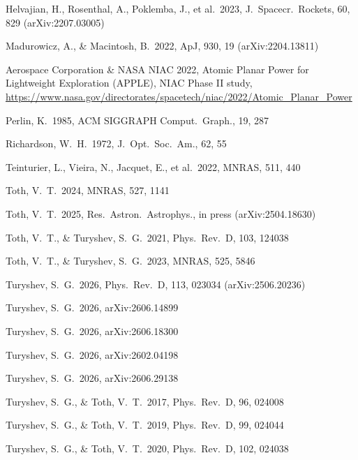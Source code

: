﻿\documentclass[twocolumn,10pt]{article}
\begin{document}
\begin{thebibliography}{}
Helvajian, H., Rosenthal, A., Poklemba, J., et al.\ 2023, J.\ Spacecr.\
Rockets, 60, 829 (arXiv:2207.03005)

Madurowicz, A., \& Macintosh, B.\ 2022, ApJ, 930, 19 (arXiv:2204.13811)

Aerospace Corporation \& NASA NIAC 2022, Atomic Planar Power for
Lightweight Exploration (APPLE), NIAC Phase II study,
\url{https://www.nasa.gov/directorates/spacetech/niac/2022/Atomic_Planar_Power}

Perlin, K.\ 1985, ACM SIGGRAPH Comput.\ Graph., 19, 287

Richardson, W.~H.\ 1972, J.\ Opt.\ Soc.\ Am., 62, 55

Teinturier, L., Vieira, N., Jacquet, E., et al.\ 2022, MNRAS, 511, 440

Toth, V.~T.\ 2024, MNRAS, 527, 1141

Toth, V.~T.\ 2025, Res.\ Astron.\ Astrophys., in press
(arXiv:2504.18630)

Toth, V.~T., \& Turyshev, S.~G.\ 2021, Phys.\ Rev.\ D, 103, 124038

Toth, V.~T., \& Turyshev, S.~G.\ 2023, MNRAS, 525, 5846

Turyshev, S.~G.\ 2026, Phys.\ Rev.\ D, 113, 023034 (arXiv:2506.20236)

Turyshev, S.~G.\ 2026, arXiv:2606.14899

Turyshev, S.~G.\ 2026, arXiv:2606.18300

Turyshev, S.~G.\ 2026, arXiv:2602.04198

Turyshev, S.~G.\ 2026, arXiv:2606.29138

Turyshev, S.~G., \& Toth, V.~T.\ 2017, Phys.\ Rev.\ D, 96, 024008

Turyshev, S.~G., \& Toth, V.~T.\ 2019, Phys.\ Rev.\ D, 99, 024044

Turyshev, S.~G., \& Toth, V.~T.\ 2020, Phys.\ Rev.\ D, 102, 024038


\end{thebibliography}
\end{document}
